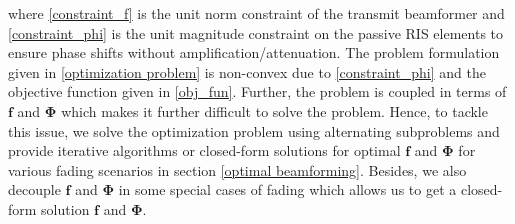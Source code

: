 \documentclass[journal,draftclsnofoot,onecolumn,12pt]{IEEEtran}
\begin{document}
\noindent where \eqref{constraint_f} is the unit norm constraint of the transmit beamformer and \eqref{constraint_phi} is the unit magnitude constraint on the passive RIS elements to ensure phase shifts without  amplification/attenuation.
The problem formulation given in \eqref{optimization problem} is non-convex due to \eqref{constraint_phi} and the objective function given in \eqref{obj_fun}. Further, the problem is coupled in terms of $\mathbf{f}$ and $\mathbf{\Phi}$ which makes it further difficult to solve the problem. Hence, to tackle this issue, we solve the optimization problem using alternating subproblems and provide iterative algorithms or closed-form solutions for optimal $\mathbf{f}$ and $\mathbf{\Phi}$ for various fading scenarios in section \ref{optimal beamforming}. Besides, we also decouple $\mathbf{f}$ and $\mathbf{\Phi}$ in some special cases of fading which allows us to get a closed-form solution $\mathbf{f}$ and $\mathbf{\Phi}$. 
\end{document}
